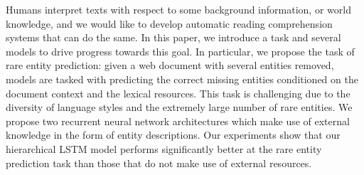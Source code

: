 Humans interpret texts with respect to some background information, or world knowledge, and we would like to develop automatic reading comprehension systems that can do the same. In this paper, we introduce a task and several models to drive progress towards this goal. In particular, we propose the task of rare entity prediction: given a web document with several entities removed, models are tasked with predicting the correct missing entities conditioned on the document context and the lexical resources. This task is challenging due to the diversity of language styles and the extremely large number of rare entities. We propose two recurrent neural network architectures which make use of external knowledge in the form of entity descriptions. Our experiments show that our hierarchical LSTM model performs significantly better at the rare entity prediction task than those that do not make use of external resources.
